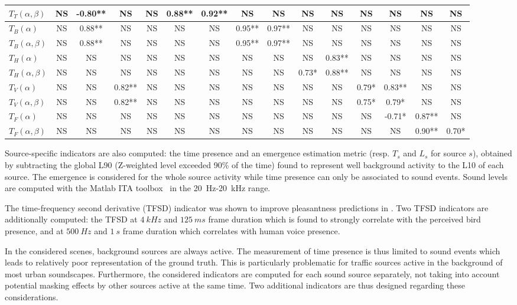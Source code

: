 \documentclass{article}
\begin{document}
\begin{sloppy}
\begin{table}[ht!]
{\begin{tabular}{ l | c c c c c c c c c c c c c c }
	$T_T(\alpha, \beta)$ & NS & -0.80** & NS & NS & 0.88** & 0.92** & NS & NS & NS & NS & NS & NS & NS & NS \\ \hline
	$T_B(\alpha)$ & NS & 0.88** & NS & NS & NS & NS & 0.95** & 0.97** & NS & NS & NS & NS & NS & NS \\
	$T_B(\alpha, \beta)$ & NS & 0.88** & NS & NS & NS & NS & 0.95** & 0.97** & NS & NS & NS & NS & NS & NS \\ \hline
	$T_H(\alpha)$ & NS & NS & NS & NS & NS & NS & NS & NS & NS & 0.83** & NS & NS & NS & NS \\
	$T_H(\alpha, \beta)$ & NS & NS & NS & NS & NS & NS & NS & NS & 0.73* & 0.88** & NS & NS & NS & NS \\ \hline
	$T_V(\alpha)$ & NS & NS & 0.82** & NS & NS & NS & NS & NS & NS & NS & 0.79* & 0.83** & NS & NS \\
	$T_V(\alpha, \beta)$ & NS & NS & 0.82** & NS & NS & NS & NS & NS & NS & NS & 0.75* & 0.79* & NS & NS \\ \hline
	$T_F(\alpha)$ & NS & NS & NS & NS & NS & NS & NS & NS & NS & NS & NS & -0.71* & 0.87** & NS \\
	$T_F(\alpha, \beta)$ & NS & NS & NS & NS & NS & NS & NS & NS & NS & NS & NS & NS & 0.90** & 0.70* \\ \hline
\end{tabular}
}
\end{table}

Source-specific indicators are also computed: the time presence and an emergence estimation metric (resp. $T_s$ and $L_s$ for source $s$), obtained by subtracting the global L90 (Z-weighted level exceeded 90\% of the time) found to represent well background activity to the L10 of each source. The emergence is considered for the whole source activity while time presence can only be associated to sound events. Sound levels are computed with the Matlab ITA toolbox~\cite{itatoolbox2017} in the 20~Hz-20~kHz range.

The time-frequency second derivative (TFSD) indicator was shown to improve pleasantness predictions in \cite{aumond2017}. Two TFSD indicators are additionally computed: the TFSD at $4~kHz$ and $125~ms$ frame duration which is found to strongly correlate with the perceived bird presence, and at $500~Hz$ and $1~s$ frame duration which correlates with human voice presence.

In the considered scenes, background sources are always active. The measurement of time presence is thus limited to sound events which leads to relatively poor representation of the ground truth. This is particularly problematic for traffic sources active in the background of most urban soundscapes. Furthermore, the considered indicators are computed for each sound source separately, not taking into account potential masking effects by other sources active at the same time. Two additional indicators are thus designed regarding these considerations.


\end{sloppy}
\end{document}
